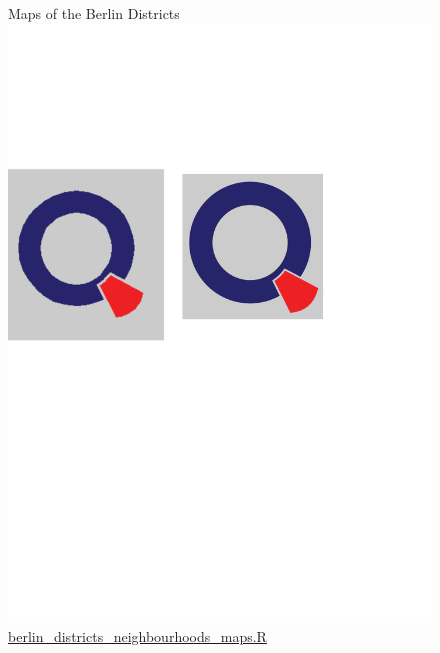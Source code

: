 \begin{figure}[H]
\centering
{}
\caption{Maps of the Berlin Districts \protect\includegraphics[scale=0.05]{qletlogo.pdf} {\href{https://github.com/silvia-ventoruzzo/SPL-WISE-2018/blob/master/Berlin_Districts_Neighbourhoods/berlin_districts_neighbourhoods_maps.R}{berlin\_districts\_neighbourhoods\_maps.R}}}
\centering
\label{figure:berlin_map}
\end{figure}

